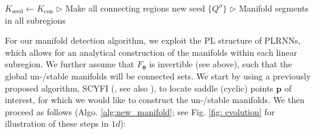 \documentclass{article}
\theoremstyle{example}
\theoremstyle{plain}
\theoremstyle{definition}
\theoremstyle{remark}
\begin{document}
\begin{algorithm}[!htbp]
\begin{algorithmic}[1]
            \EndFor
            \State $K_\text{seed} \gets K_\text{con}$ \hfill $\triangleright$ Make all connecting regions new seed
    \EndWhile
    \State \Return $\{Q^\sigma\}$
    \hfill $\triangleright$ Manifold segments in all subregions
\end{algorithmic}
\end{algorithm}

For our manifold detection algorithm, we exploit the PL structure of PLRNNs, which allows for an analytical construction of the manifolds within each linear subregion. We further assume that $F_{\mathbf{\theta}}$ is invertible (see above), such that the global un-/stable manifolds will be connected sets. We start by using a previously proposed algorithm, SCYFI (\cite{eisenmann_bifurcations_2023}, see also \cite{pals2024inferring}), to locate saddle (cyclic) points $\bm{p}$ of interest, for which we would like to construct the un-/stable manifolds. We then proceed as follows (Algo. \ref{alg:new_manifold}; see Fig. \ref{fig: evolution} for illustration of these steps in $1d$):
\end{document}
